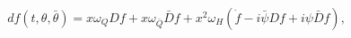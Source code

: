 \begin{equation}\label{Diff}
 df(t,\theta,\bar\theta)=x\omega_QDf+x\omega_{\bar Q}\bar D
f+x^2\omega_H(\dot f-i\bar\psi Df+i\psi\bar D f),
\end{equation}

